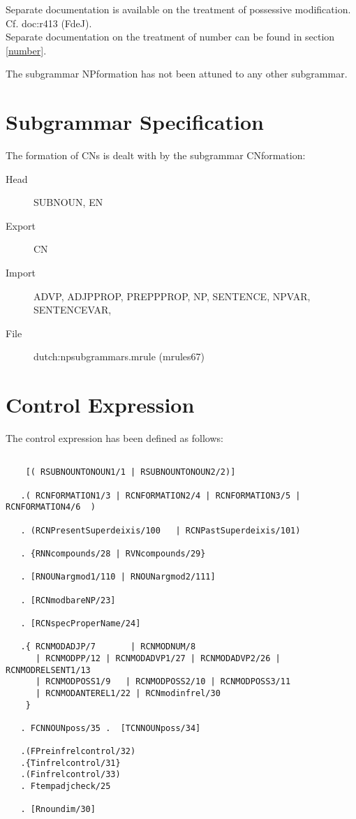 \noindent
Separate documentation is available on the treatment of 
possessive modification. Cf. doc:r413 (FdeJ).\\
Separate documentation on the treatment of number can be found in section 
\ref{number}.

The subgrammar NPformation has not been attuned to any other subgrammar.


\section{Subgrammar Specification}

The formation of CNs is dealt with by 
the subgrammar CNformation:\\


\begin{description}
  \item[Head] SUBNOUN, EN 
  \item[Export] CN
  \item[Import] ADVP, ADJPPROP, PREPPPROP, NP, SENTENCE, NPVAR, SENTENCEVAR, 
  \item[File] dutch:npsubgrammars.mrule (mrules67)
\end{description}

\section{Control Expression}
The control expression has been defined as follows:

\begin{verbatim}

    [( RSUBNOUNTONOUN1/1 | RSUBNOUNTONOUN2/2)]

   .( RCNFORMATION1/3 | RCNFORMATION2/4 | RCNFORMATION3/5 | RCNFORMATION4/6  )

   . (RCNPresentSuperdeixis/100   | RCNPastSuperdeixis/101)

   . {RNNcompounds/28 | RVNcompounds/29}

   . [RNOUNargmod1/110 | RNOUNargmod2/111]

   . [RCNmodbareNP/23]

   . [RCNspecProperName/24]

   .{ RCNMODADJP/7       | RCNMODNUM/8    
      | RCNMODPP/12 | RCNMODADVP1/27 | RCNMODADVP2/26 | RCNMODRELSENT1/13 
      | RCNMODPOSS1/9   | RCNMODPOSS2/10 | RCNMODPOSS3/11 
      | RCNMODANTEREL1/22 | RCNmodinfrel/30
    }            

   . FCNNOUNposs/35 .  [TCNNOUNposs/34] 

   .(FPreinfrelcontrol/32)
   .{Tinfrelcontrol/31}
   .(Finfrelcontrol/33)
   . Ftempadjcheck/25

   . [Rnoundim/30]

\end{verbatim}

